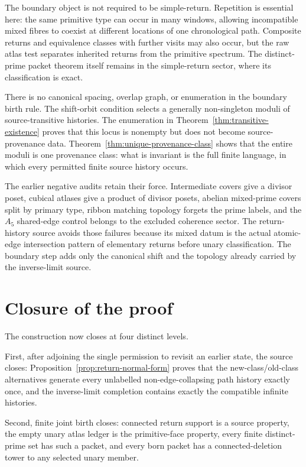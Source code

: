 \documentclass[11pt]{article}
\begin{document}
The boundary object is not required to be simple-return.  Repetition is
essential here: the same primitive type can occur in many windows, allowing
incompatible mixed fibres to coexist at different locations of one
chronological path.  Composite returns and equivalence classes with further
visits may also occur, but the raw atlas test separates inherited returns from
the primitive spectrum.  The distinct-prime packet theorem itself remains in
the simple-return sector, where its classification is exact.

There is no canonical spacing, overlap graph, or enumeration in the boundary
birth rule.  The shift-orbit condition selects a generally non-singleton
moduli of source-transitive histories.  The enumeration in
Theorem~\ref{thm:transitive-existence} proves that this locus is nonempty but
does not become source-provenance data.  Theorem~\ref{thm:unique-provenance-class}
shows that the entire moduli is one provenance class: what is invariant is
the full finite language, in which every permitted finite source history
occurs.

The earlier negative audits retain their force.  Intermediate covers give a
divisor poset, cubical atlases give a product of divisor posets, abelian
mixed-prime covers split by primary type, ribbon matching topology forgets the
prime labels, and the \(A_5\) shared-edge control belongs to the excluded
coherence sector.  The return-history source avoids those failures because
its mixed datum is the actual atomic-edge intersection pattern of elementary
returns before unary classification.  The boundary step adds only the
canonical shift and the topology already carried by the inverse-limit source.

\section{Closure of the proof}

The construction now closes at four distinct levels.

First, after adjoining the single permission to revisit an earlier state, the
source closes: Proposition~\ref{prop:return-normal-form} proves that the
new-class/old-class alternatives generate every unlabelled
non-edge-collapsing path history exactly once, and the inverse-limit completion
contains exactly the compatible infinite histories.

Second, finite joint birth closes: connected return support is a source
property, the empty unary atlas ledger is the primitive-face property, every
finite distinct-prime set has such a packet, and every born packet has a
connected-deletion tower to any selected unary member.
\end{document}

